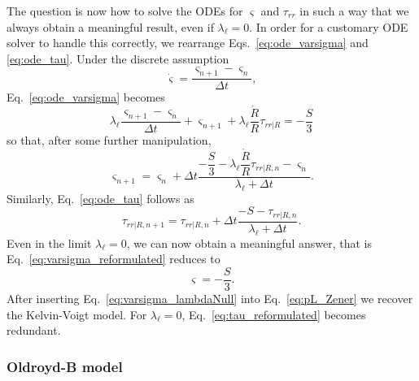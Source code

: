 The question is now how to solve the ODEs for $\varsigma$ and $\tau_{rr}$ in such a way that we always obtain a meaningful result, even if $\lambda_\ell=0$. In order for a customary ODE solver to handle this correctly, we rearrange Eqs.~\eqref{eq:ode_varsigma} and \eqref{eq:ode_tau}. Under the discrete assumption
\begin{equation}
    \dot{\varsigma}  = \frac{\varsigma_{n+1}-\varsigma_n}{\Delta t},
\end{equation}
Eq.~\eqref{eq:ode_varsigma} becomes
\begin{equation}
    \lambda_\ell \frac{\varsigma_{n+1}-\varsigma_n}{\Delta t} + \varsigma_{n+1} +\lambda_\ell \frac{\dot{R}}{R} {\tau}_{rr|R} = - \frac{S}{3}
  \end{equation}
so that, after some further manipulation,
\begin{equation}
    \varsigma_{n+1} =  \varsigma_n + \Delta t \frac{- \dfrac{S}{3} - \lambda_\ell  \dfrac{\dot{R}}{R} {\tau}_{rr|R,n} - \varsigma_n}{\lambda_\ell + \Delta t}. \label{eq:varsigma_reformulated}
  \end{equation}
Similarly, Eq.~\eqref{eq:ode_tau} follows as
\begin{equation}
   {\tau}_{rr|R,n+1} = {\tau}_{rr|R,n} + \Delta t \frac{-S-{\tau}_{rr|R,n}}{\lambda_\ell + \Delta t}.
   \label{eq:tau_reformulated}
\end{equation}
Even in the limit $\lambda_\ell = 0$, we can now obtain a meaningful answer, that is Eq.~\eqref{eq:varsigma_reformulated} reduces to
\begin{equation}
    \varsigma = -\frac{S}{3}. \label{eq:varsigma_lambdaNull}
\end{equation}
After inserting Eq.~\eqref{eq:varsigma_lambdaNull} into Eq.~\eqref{eq:pL_Zener} we recover the Kelvin-Voigt model. For $\lambda_\ell = 0$, Eq.~\eqref{eq:tau_reformulated} becomes redundant.

\subsubsection{Oldroyd-B model}

